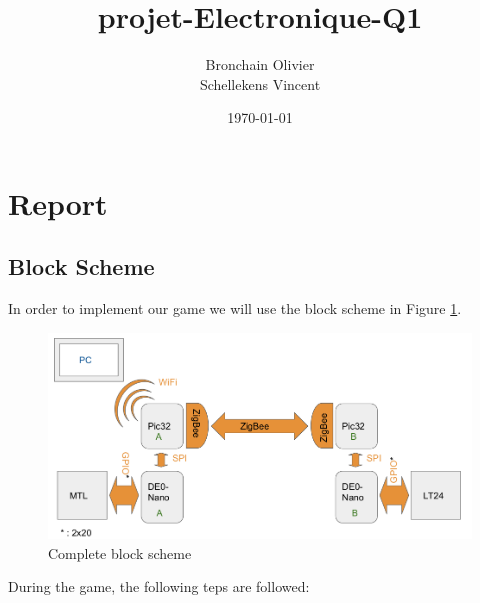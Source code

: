 \documentclass[10pt,a4paper]{article}
\title{projet-Electronique-Q1}
\author{Bronchain Olivier \\ Schellekens Vincent}
\date{\today}
\begin{document}
\maketitle

\section{Report}
\subsection{Block Scheme}
    In order to implement our game we will use the block scheme in Figure \ref{Block}. \\
    \begin{figure}[h!]
        \centering
        \includegraphics[width = 0.8 \textwidth]{lol3.png}
        \caption{Complete block scheme \label{Block}}
    \end{figure}
    During the game, the following teps are followed:
\end{document}
